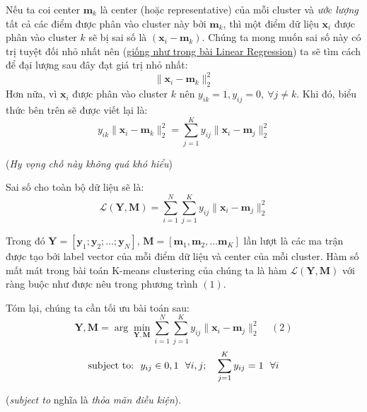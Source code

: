 Nếu ta coi center $\mathbf{m}_k $  là center (hoặc representative) của mỗi cluster và \textit{ước lượng} tất cả các điểm được phân vào cluster này bởi $\mathbf{m}_k $, thì một điểm dữ liệu $\mathbf{x}_i $ được phân vào cluster $k$ sẽ bị sai số là $ (\mathbf{x}_i - \mathbf{m}_k) $. Chúng ta mong muốn sai số này có trị tuyệt đối nhỏ nhất nên (\href{http://machinelearningcoban.com/2016/12/28/linearregression/#sai-so-du-doan}{giống như trong bài Linear Regression}) ta sẽ tìm cách để đại lượng sau đây đạt giá trị nhỏ nhất:  
\begin{equation}
\|\mathbf{x}_i - \mathbf{m}_k\|_2^2 
\end{equation}
Hơn nữa, vì $\mathbf{x}_i $ được phân vào cluster $k$ nên $y_{ik} = 1, y_{ij} = 0, ~\forall j \neq k $. Khi đó, biểu thức bên trên sẽ được viết lại là: 
\begin{equation}
y_{ik}\|\mathbf{x}_i - \mathbf{m}_k\|_2^2 =  \sum_{j=1}^K y_{ij}\|\mathbf{x}_i - \mathbf{m}_j\|_2^2 
\end{equation}
 
(\textit{Hy vọng chỗ này không quá khó hiểu}) 
 
 
 
Sai số cho toàn bộ dữ liệu sẽ là:  
\begin{equation}
\mathcal{L}(\mathbf{Y}, \mathbf{M}) = \sum_{i=1}^N\sum_{j=1}^K y_{ij} \|\mathbf{x}_i - \mathbf{m}_j\|_2^2 
\end{equation}
 
Trong đó $ \mathbf{Y} = [\mathbf{y}_1; \mathbf{y}_2; \dots; \mathbf{y}_N]$, $ \mathbf{M} = [\mathbf{m}_1, \mathbf{m}_2, \dots \mathbf{m}_K] $ lần lượt là các ma trận được tạo bởi label vector của mỗi điểm dữ liệu và center của mỗi cluster. Hàm số mất mát trong bài toán K-means clustering của chúng ta là hàm $\mathcal{L}(\mathbf{Y}, \mathbf{M})$ với ràng buộc như được nêu trong phương trình $(1)$. 
 
Tóm lại, chúng ta cần tối ưu bài toán sau:  
\begin{equation}
\mathbf{Y}, \mathbf{M} = \arg\min_{\mathbf{Y}, \mathbf{M}} \sum_{i=1}^N\sum_{j=1}^K y_{ij} \|\mathbf{x}_i - \mathbf{m}_j\|_2^2~~~~~(2) 
\end{equation}
 \begin{equation}
\text{subject to:} ~~ y_{ij} \in \\{0, 1\\}~~ \forall i, j;~~~ \sum_{j = 1}^K y_{ij} = 1~~\forall i 
\end{equation}
 
(\textit{subject to} nghĩa là \textit{thỏa mãn điều kiện}). 
 
